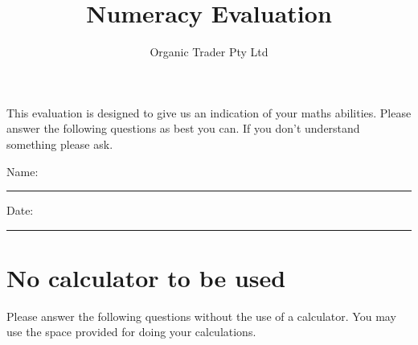 \documentclass[a4paper]{article}
\begin{document}
\newcommand{\answer}[1]{
  \textcolor{red}{#1}
}
\ifdefined\showanswers
\else
  \renewcommand{\answer}[1]{}
\fi
\title{Numeracy Evaluation \answer{with answers}}
\author{Organic Trader Pty Ltd}

\maketitle
\noindent This evaluation is designed to give us an indication of your maths abilities. Please answer the following questions as best you can. If you don't understand something please ask.

\hspace{5mm}

\noindent Name: \rule{3cm}{0.2pt}

\hspace{5mm}

\noindent Date: \rule{3cm}{0.2pt}



\section{No calculator to be used}

Please answer the following questions without the use of a calculator. You may use the space provided for doing your calculations.
\end{document}
